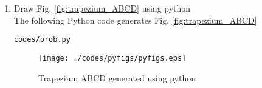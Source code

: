 \begin{enumerate}[label=\thesection.\arabic*.,ref=\thesection.\theenumi]
%
\item Draw Fig. \ref{fig:trapezium_ABCD} using python	
\\
\solution The  following Python code generates Fig. \ref{fig:trapezium_ABCD}
%
\begin{lstlisting}
codes/prob.py
\end{lstlisting}
\begin{figure}[!ht]
\centering
\texttt{[image: ./codes/pyfigs/pyfigs.eps]}
\caption{Trapezium ABCD generated using python}
\label{fig:trap_py}
\end{figure}


\end{enumerate}
